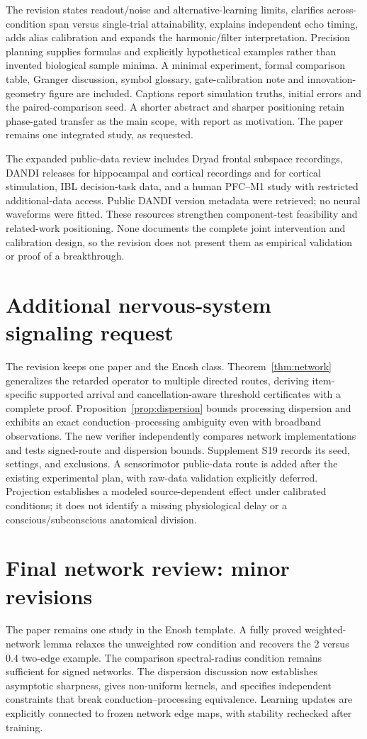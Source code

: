 \documentclass[11pt,a4paper]{article}
\begin{document}
The revision states readout/noise and alternative-learning limits, clarifies across-condition span versus single-trial attainability, explains independent echo timing, adds alias calibration and expands the harmonic/filter interpretation. Precision planning supplies formulas and explicitly hypothetical examples rather than invented biological sample minima. A minimal experiment, formal comparison table, Granger discussion, symbol glossary, gate-calibration note and innovation-geometry figure are included. Captions report simulation truths, initial errors and the paired-comparison seed. A shorter abstract and sharper positioning retain phase-gated transfer as the main scope, with report as motivation. The paper remains one integrated study, as requested.

The expanded public-data review includes Dryad frontal subspace recordings, DANDI releases for hippocampal and cortical recordings and for cortical stimulation, IBL decision-task data, and a human PFC--M1 study with restricted additional-data access. Public DANDI version metadata were retrieved; no neural waveforms were fitted. These resources strengthen component-test feasibility and related-work positioning. None documents the complete joint intervention and calibration design, so the revision does not present them as empirical validation or proof of a breakthrough.
\section*{Additional nervous-system signaling request}
The revision keeps one paper and the Enosh class. Theorem~\ref{thm:network} generalizes the retarded operator to multiple directed routes, deriving item-specific supported arrival and cancellation-aware threshold certificates with a complete proof. Proposition~\ref{prop:dispersion} bounds processing dispersion and exhibits an exact conduction--processing ambiguity even with broadband observations. The new verifier independently compares network implementations and tests signed-route and dispersion bounds. Supplement S19 records its seed, settings, and exclusions. A sensorimotor public-data route is added after the existing experimental plan, with raw-data validation explicitly deferred. Projection establishes a modeled source-dependent effect under calibrated conditions; it does not identify a missing physiological delay or a conscious/subconscious anatomical division.

\section*{Final network review: minor revisions}
The paper remains one study in the Enosh template. A fully proved weighted-network lemma relaxes the unweighted row condition and recovers the 2 versus 0.4 two-edge example. The comparison spectral-radius condition remains sufficient for signed networks. The dispersion discussion now establishes asymptotic sharpness, gives non-uniform kernels, and specifies independent constraints that break conduction--processing equivalence. Learning updates are explicitly connected to frozen network edge maps, with stability rechecked after training.
\end{document}
